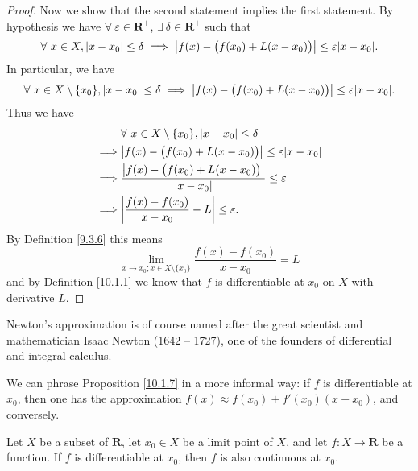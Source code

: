 \begin{proof}
    Now we show that the second statement implies the first statement.
    By hypothesis we have \(\forall\ \varepsilon \in \mathbf{R}^+\), \(\exists\ \delta \in \mathbf{R}^+\) such that
    \[
        \forall\ x \in X, \abs*{x - x_0} \leq \delta \implies \abs*{f(x) - \big(f(x_0) + L(x - x_0)\big)} \leq \varepsilon \abs*{x - x_0}.
    \]
    In particular, we have
    \[
        \forall\ x \in X \setminus \{x_0\}, \abs*{x - x_0} \leq \delta \implies \abs*{f(x) - \big(f(x_0) + L(x - x_0)\big)} \leq \varepsilon \abs*{x - x_0}.
    \]
    Thus we have
    \begin{align*}
                 & \forall\ x \in X \setminus \{x_0\}, \abs*{x - x_0} \leq \delta                      \\
        \implies & \abs*{f(x) - \big(f(x_0) + L(x - x_0)\big)} \leq \varepsilon \abs*{x - x_0}         \\
        \implies & \frac{\abs*{f(x) - \big(f(x_0) + L(x - x_0)\big)}}{\abs*{x - x_0}} \leq \varepsilon \\
        \implies & \abs*{\frac{f(x) - f(x_0)}{x - x_0} - L} \leq \varepsilon.
    \end{align*}
    By Definition \ref{9.3.6} this means
    \[
        \lim_{x \to x_0 ; x \in X \setminus \{x_0\}} \frac{f(x) - f(x_0)}{x - x_0} = L
    \]
    and by Definition \ref{10.1.1} we know that \(f\) is differentiable at \(x_0\) on \(X\) with derivative \(L\).
\end{proof}

\begin{remark}\label{10.1.8}
    Newton's approximation is of course named after the great scientist and mathematician Isaac Newton (1642 -- 1727), one of the founders of differential and integral calculus.
\end{remark}

\begin{remark}\label{10.1.9}
    We can phrase Proposition \ref{10.1.7} in a more informal way:
    if \(f\) is differentiable at \(x_0\), then one has the approximation \(f(x) \approx f(x_0) + f'(x_0)(x - x_0)\), and conversely.
\end{remark}

\begin{proposition}\label{10.1.10}
    Let \(X\) be a subset of \(\mathbf{R}\), let \(x_0 \in X\) be a limit point of \(X\), and let \(f : X \to \mathbf{R}\) be a function.
    If \(f\) is differentiable at \(x_0\), then \(f\) is also continuous at \(x_0\).
\end{proposition}


